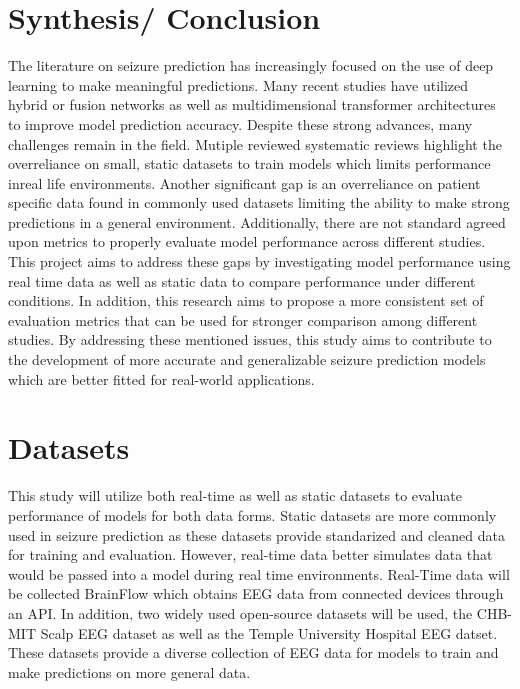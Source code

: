 \documentclass[conference]{IEEEtran}
\begin{document}
\section{Synthesis/ Conclusion}
\noindent The literature on seizure prediction has increasingly focused on the use of deep learning to make meaningful predictions. Many recent studies have utilized hybrid or fusion networks as well as multidimensional transformer architectures to improve model prediction accuracy. Despite these strong advances, many challenges remain in the field. Mutiple reviewed systematic reviews highlight the overreliance on small, static datasets to train models which limits performance inreal life environments. Another significant gap is an overreliance on patient specific data found in commonly used datasets limiting the ability to make strong predictions in a general environment. Additionally, there are not standard agreed upon metrics to properly evaluate model performance across different studies. This project aims to address these gaps by investigating model performance using real time data as well as static data to compare performance under different conditions. In addition, this research aims to propose a more consistent set of evaluation metrics that can be used for stronger comparison among different studies. By addressing these mentioned issues, this study aims to contribute to the development of more accurate and generalizable seizure prediction models which are better fitted for real-world applications.
\nocite{*}
\section{Datasets}
\noindent This study will utilize both real-time as well as static datasets to evaluate performance of models for both data forms. Static datasets are more commonly used in seizure prediction as these datasets provide standarized and cleaned data for training and evaluation. However, real-time data better simulates data that would be passed into a model during real time environments. Real-Time data will be collected BrainFlow which obtains EEG data from connected devices through an API. In addition, two widely used open-source datasets will be used, the CHB-MIT Scalp EEG dataset as well as the Temple University Hospital EEG datset. These datasets provide a diverse collection of EEG data for models to train and make predictions on more general data.
\printbibliography
\end{document}
